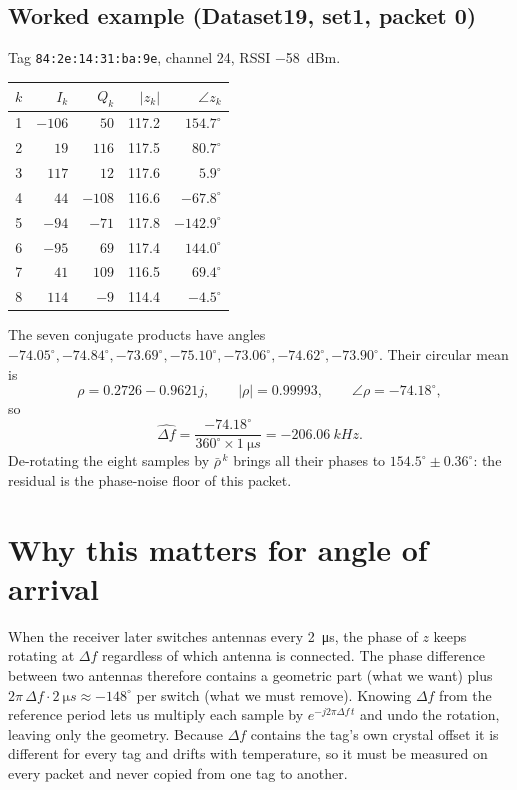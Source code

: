 \documentclass[11pt,a4paper]{article}
\begin{document}
\subsection*{Worked example (Dataset19, set1, packet 0)}
Tag \texttt{84:2e:14:31:ba:9e}, channel 24, RSSI \SI{-58}{dBm}.

\begin{center}
\begin{tabular}{crrrr}
\toprule
$k$ & $I_k$ & $Q_k$ & $|z_k|$ & $\angle z_k$ \\
\midrule
1 & $-106$ &   $50$ & 117.2 & $154.7^\circ$ \\
2 &   $19$ &  $116$ & 117.5 &  $80.7^\circ$ \\
3 &  $117$ &   $12$ & 117.6 &   $5.9^\circ$ \\
4 &   $44$ & $-108$ & 116.6 & $-67.8^\circ$ \\
5 &  $-94$ &  $-71$ & 117.8 & $-142.9^\circ$ \\
6 &  $-95$ &   $69$ & 117.4 & $144.0^\circ$ \\
7 &   $41$ &  $109$ & 116.5 &  $69.4^\circ$ \\
8 &  $114$ &   $-9$ & 114.4 &  $-4.5^\circ$ \\
\bottomrule
\end{tabular}
\end{center}

The seven conjugate products have angles $-74.05^\circ, -74.84^\circ, -73.69^\circ, -75.10^\circ, -73.06^\circ, -74.62^\circ, -73.90^\circ$. Their circular mean is
\[
  \rho = 0.2726 - 0.9621j,\qquad |\rho| = 0.99993,\qquad \angle\rho = -74.18^\circ ,
\]
so
\[
  \hat{\Delta f} = \frac{-74.18^\circ}{360^\circ \times \SI{1}{\micro s}} = -\SI{206.06}{kHz}.
\]
De-rotating the eight samples by $\bar\rho^{\,k}$ brings all their phases to $154.5^\circ \pm 0.36^\circ$: the residual is the phase-noise floor of this packet.

\section{Why this matters for angle of arrival}
When the receiver later switches antennas every \SI{2}{\micro s}, the phase of $z$ keeps rotating at $\Delta f$ regardless of which antenna is connected. The phase difference between two antennas therefore contains a geometric part (what we want) plus $2\pi\,\Delta f\cdot\SI{2}{\micro s} \approx -148^\circ$ per switch (what we must remove). Knowing $\Delta f$ from the reference period lets us multiply each sample by $e^{-j2\pi\Delta f\,t}$ and undo the rotation, leaving only the geometry. Because $\Delta f$ contains the tag's own crystal offset it is different for every tag and drifts with temperature, so it must be measured on every packet and never copied from one tag to another.
\end{document}
